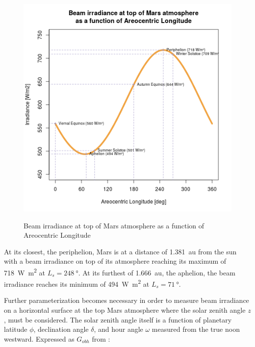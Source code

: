 \begin{figure}[H]%
  \centering
  \hypersetup{linkcolor=captionTextColor}
  \includegraphics[width=0.8\linewidth]{sections/martian-environment/plots/beam-irradiance-at-top-of-mars-atmosphere-as-a-function-of-areocentric-longitude.png}\\
  \caption[Beam irradiance at top of Mars atmosphere as a function of Areocentric Longitude]
          {Beam irradiance at top of Mars atmosphere as a function of Areocentric Longitude}
  \label{fig:plot:beam-irradiance-top-of-mars-atmosphere}
\end{figure}

At its closest, the periphelion, Mars is at a distance of \SI{1.381}{\astronomicalunit} from the sun with a beam irradiance on top of its atmosphere reaching its maximum of \SI{718}{\watt\meter\squared} at $L_{s} = \SI{248}{\degree}$. At its furthest of \SI{1.666}{\astronomicalunit}, the aphelion, the beam irradiance reaches its minimum of \SI{494}{\watt\meter\squared} at $L_{s} = \SI{71}{\degree}$.

Further parameterization becomes necessary in order to measure beam irradiance on a horizontal surface at the top Mars atmosphere where the solar zenith angle $z$, must be considered. The solar zenith angle itself is a function of planetary latitude $\phi$, declination angle $\delta$, and hour angle $\omega$ measured from the true noon westward. Expressed as $G_{obh}$ from :

